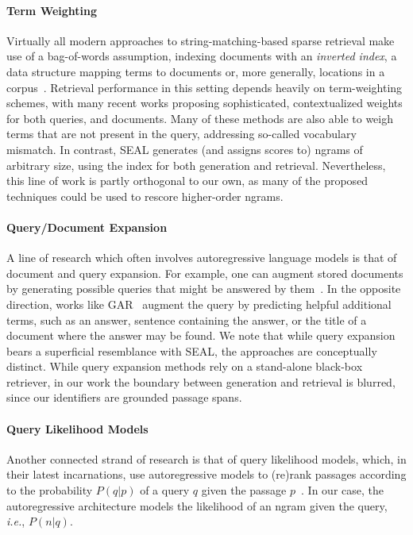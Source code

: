 \documentclass[11pt]{article}
\newcommand{\ie}{\textit{i.e.}}
\newcommand{\system}{\textsc{SEAL}}
\begin{document}
\paragraph{Term Weighting}
Virtually all modern approaches to string-matching-based sparse retrieval make use of a bag-of-words assumption, indexing documents with an \emph{inverted index}, a data structure mapping terms to documents or, more generally, locations in a corpus~\citep{robertson-zaragoza-2009-probabilistic}.
Retrieval performance in this setting depends heavily on term-weighting schemes, with many recent works proposing sophisticated, contextualized weights for both queries, and documents\citep{dai-callan-2019-context,gao-etal-2021-coil,lin-ma-2021-unicoil,mallia-etal-2021-deepimpact,dai-callan-2020-context,bai-etal-2020-sparterm,zhao-etal-2021-sparta,formal-etal-2021-splade,formal-etal-2021-spladev2}.
Many of these methods are also able to weigh terms that are not present in the query, addressing so-called vocabulary mismatch. In contrast, \system{} generates (and assigns scores to) ngrams of arbitrary size, using the index for both generation and retrieval. Nevertheless, this line of work is partly orthogonal to our own, as many of the proposed techniques could be used to rescore higher-order ngrams.

\paragraph{Query/Document Expansion}
A line of research which often involves autoregressive language models is that of document and query expansion. For example, one can augment stored documents by generating possible queries that might be answered by them~\citep{nogueira-etal-2019-doc2query,nogueira-lin-2019-docTTTTTquery}. 
In the opposite direction, works like GAR~\citep{mao-etal-2021-generation} augment the query by predicting helpful additional terms, such as an answer, sentence containing the answer, or the title of a document where the answer may be found.
We note that while query expansion bears a superficial resemblance with \system{}, the approaches are  conceptually distinct. 
While query expansion methods rely on a stand-alone black-box retriever, in our work the boundary between generation and retrieval is blurred, since our identifiers are grounded passage spans. 

\paragraph{Query Likelihood Models}
Another connected strand of research is that of query likelihood models, which, in their latest incarnations, use autoregressive models to (re)rank passages according to the probability $P(q|p)$ of a query $q$ given the passage $p$~\citep{nogueira-dos-santos-etal-2020-beyond,zhuang-zuccon-2021-tilde,lesota-etal-2021-modern}. In our case, the autoregressive architecture models the likelihood of an ngram given the query, \ie, $P(n|q)$. 
\end{document}
